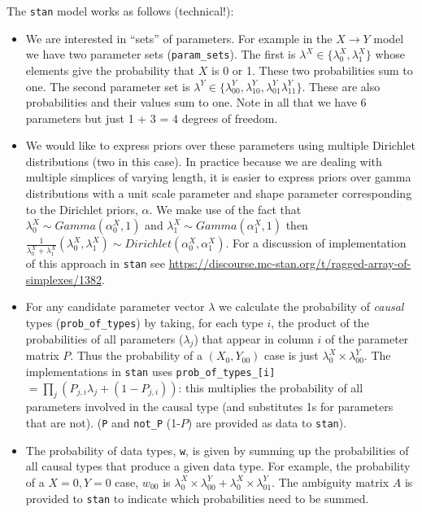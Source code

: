 \documentclass[
  12pt,
]{book}
\begin{document}
The \texttt{stan} model works as follows (technical!):

\begin{itemize}
\item
  We are interested in ``sets'' of parameters. For example in the \(X \rightarrow Y\) model we have two parameter sets (\texttt{param\_sets}). The first is \(\lambda^X \in \{\lambda^X_0, \lambda^X_1\}\) whose elements give the probability that \(X\) is 0 or 1. These two probabilities sum to one. The second parameter set is \(\lambda^Y \in \{\lambda^Y_{00}, \lambda^Y_{10}, \lambda^Y_{01} \lambda^Y_{11}\}\). These are also probabilities and their values sum to one. Note in all that we have 6 parameters but just 1 + 3 = 4 degrees of freedom.
\item
  We would like to express priors over these parameters using multiple Dirichlet distributions (two in this case). In practice because we are dealing with multiple simplices of varying length, it is easier to express priors over gamma distributions with a unit scale parameter and shape parameter corresponding to the Dirichlet priors, \(\alpha\). We make use of the fact that \(\lambda^X_0 \sim Gamma(\alpha^X_0,1)\) and \(\lambda^X_1 \sim Gamma(\alpha^X_1,1)\) then \(\frac{1}{\lambda^X_0 +\lambda^X_1}(\lambda^X_0, \lambda^X_1) \sim Dirichlet(\alpha^X_0, \alpha^X_1)\). For a discussion of implementation of this approach in \texttt{stan} see \url{https://discourse.mc-stan.org/t/ragged-array-of-simplexes/1382}.
\item
  For any candidate parameter vector \(\lambda\) we calculate the probability of \emph{causal} types (\texttt{prob\_of\_types}) by taking, for each type \(i\), the product of the probabilities of all parameters (\(\lambda_j\)) that appear in column \(i\) of the parameter matrix \(P\). Thus the probability of a \((X_0,Y_{00})\) case is just \(\lambda^X_0 \times \lambda^Y_{00}\). The implementations in \texttt{stan} uses \texttt{prob\_of\_types\_{[}i{]}} \(= \prod_j \left(P_{j,i} \lambda_j + (1-P_{j,i})\right)\): this multiplies the probability of all parameters involved in the causal type (and substitutes 1s for parameters that are not). (\texttt{P} and \texttt{not\_P} (1-\(P\)) are provided as data to \texttt{stan}).
\item
  The probability of data types, \texttt{w}, is given by summing up the probabilities of all causal types that produce a given data type. For example, the probability of a \(X=0,Y=0\) case, \(w_{00}\) is \(\lambda^X_0\times \lambda^Y_{00} + \lambda^X_0\times \lambda^Y_{01}\). The ambiguity matrix \(A\) is provided to \texttt{stan} to indicate which probabilities need to be summed.

\end{itemize}
\end{document}
